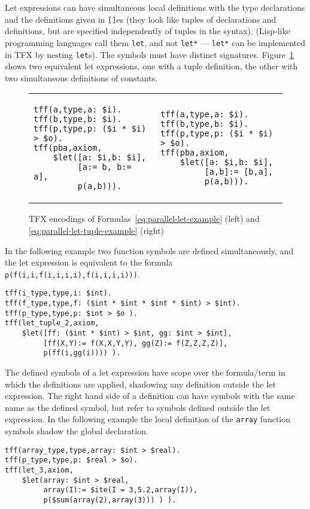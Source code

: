 \documentclass{easychair}
\begin{document}
Let expressions can have simultaneous local definitions
with the type declarations and the definitions given in {\tt []}es
(they look like tuples of declarations and definitions, but are
specified independently of tuples in the syntax).
(Lisp-like programming languages call them \verb'let', and 
not \verb'let*' --- \verb'let*' can be implemented in TFX by nesting
\verb'let's).
The symbols must have distinct signatures.
Figure~\ref{fig:pba-tfx} shows two equivalent let expressions, one with a tuple definition, the other with two simultaneous definitions of constants.
\begin{figure}[htbp]\quad
\begin{tabular}[t]{ll}
\begin{minipage}{0.5\textwidth}
\begin{verbatim}
tff(a,type,a: $i).
tff(b,type,b: $i).
tff(p,type,p: ($i * $i) > $o).
tff(pba,axiom,
    $let([a: $i,b: $i],
         [a:= b, b:= a],
         p(a,b))).
\end{verbatim}
\end{minipage}
    &
\begin{minipage}{0.5\textwidth}
\begin{verbatim}
tff(a,type,a: $i).
tff(b,type,b: $i).
tff(p,type,p: ($i * $i) > $o).
tff(pba,axiom,
    $let([a: $i,b: $i],
         [a,b]:= [b,a],
         p(a,b))).
\end{verbatim}
\end{minipage}
\\
\end{tabular}
\caption{TFX encodings of Formulas~\ref{eq:parallel-let-example} (left) and \ref{eq:parallel-let-tuple-example} (right)}
\label{fig:pba-tfx}
\end{figure}

In the following example two function symbols are defined simultaneously, and the let expression is equivalent to the formula \verb'p(f(i,i,f(i,i,i,i),f(i,i,i,i)))'.
\begin{verbatim}
tff(i_type,type,i: $int).
tff(f_type,type,f: ($int * $int * $int * $int) > $int).
tff(p_type,type,p: $int > $o ).
tff(let_tuple_2,axiom,
    $let([ff: ($int * $int) > $int, gg: $int > $int],
         [ff(X,Y):= f(X,X,Y,Y), gg(Z):= f(Z,Z,Z,Z)],
         p(ff(i,gg(i)))) ).
\end{verbatim}

The defined symbols of a let expression have scope over the formula/term in 
which the definitions are applied, shadowing any definition outside the let 
expression. 
The right hand side of a definition can have symbols with the same name as 
the defined symbol, but refer to symbols defined outside the let expression. 
In the following example the local definition of the {\tt array} function 
symbols shadow the global declaration.
\begin{verbatim}
tff(array_type,type,array: $int > $real).
tff(p_type,type,p: $real > $o).
tff(let_3,axiom,
    $let(array: $int > $real,
         array(I):= $ite(I = 3,5.2,array(I)),
         p($sum(array(2),array(3))) ) ).
\end{verbatim}
\end{document}

